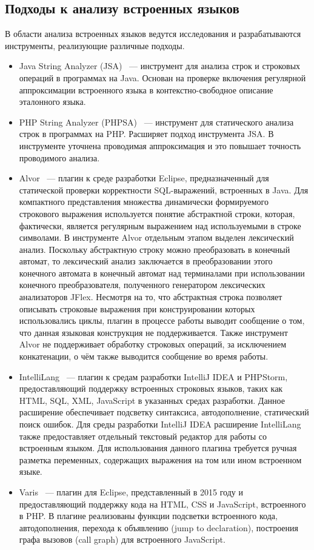 \documentclass[14pt]{matmex-diploma}
\begin{document}
\subsection{Подходы к анализу встроенных языков}
В области анализа встроенных языков ведутся исследования и разрабатываются инструменты, реализующие различные подходы. 
\begin{itemize}
\item Java String Analyzer (JSA)~\cite{JSA,JSAUrl} --- инструмент для анализа строк и строковых операций в программах на Java. Основан на проверке включения регулярной аппроксимации встроенного языка в контекстно-свободное описание эталонного языка.
\item PHP String Analyzer (PHPSA)~\cite{PHPSA,PHPSAUrl} --- инструмент для статического анализа строк в программах на PHP. Расширяет подход инструмента JSA. В инструменте уточнена проводимая аппроксимация и это повышает точность проводимого анализа. 
\item Alvor~\cite{AlvorUrl, Alvor2, Alvor1} --- плагин к среде разработки Eclipse, предназначенный для статической проверки корректности SQL-выражений, встроенных в Java. Для компактного представления множества динамически формируемого строкового выражения используется понятие абстрактной строки, которая, фактически, является регулярным выражением над используемыми в строке символами. В инструменте Alvor отдельным этапом выделен лексический анализ. Поскольку абстрактную строку можно преобразовать в конечный автомат, то лексический анализ заключается в преобразовании этого конечного автомата в конечный автомат над терминалами при использовании конечного преобразователя, полученного генератором лексических анализаторов JFlex. Несмотря на то, что абстрактная строка позволяет описывать строковые выражения при конструировании которых использовались циклы, плагин в процессе работы выводит сообщение о том, что данная языковая конструкция не поддерживается. Также инструмент Alvor не поддерживает обработку строковых операций, за исключением конкатенации, о чём также выводится сообщение во время работы.
\item IntelliLang~\cite{IntelliLang} --- плагин к средам разработки IntelliJ IDEA и PHPStorm, предоставляющий поддержку встроенных строковых языков, таких как HTML, SQL, XML, JavaScript в указанных средах разработки. Данное расширение обеспечивает подсветку синтаксиса, автодополнение, статический поиск ошибок. Для среды разработки IntelliJ IDEA расширение IntelliLang также предоставляет отдельный текстовый редактор для работы со встроенным языком. Для использования данного плагина требуется ручная разметка переменных, содержащих выражения на том или ином встроенном языке.
\item Varis~\cite{Varis} --- плагин для Eclipse, представленный в 2015 году и предоставляющий поддержку кода на HTML, CSS и JavaScript, встроенного в PHP. В плагине реализованы функции подсветки встроенного кода, автодополнения, перехода к объявлению (jump to declaration), построения графа вызовов (call graph) для встроенного JavaScript. 
\end{itemize}
\end{document}

